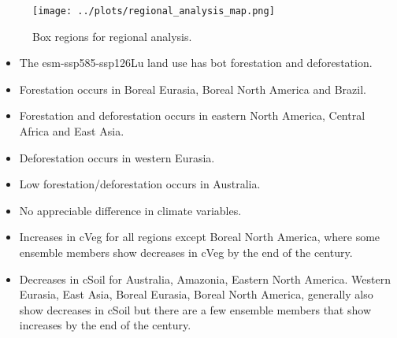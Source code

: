 \documentclass[]{article}
\begin{document}
\begin{figure}[H]
    \centering
    \texttt{[image: ../plots/regional\_analysis\_map.png]}
    \caption{Box regions for regional analysis.}
    \label{fig:box_regions}
\end{figure}

\begin{itemize}
    \item The esm-ssp585-ssp126Lu land use has bot forestation and deforestation.
    \item Forestation occurs in Boreal Eurasia, Boreal North America and Brazil.
    \item Forestation and deforestation occurs in eastern North America, Central Africa and East Asia.
    \item Deforestation occurs in western Eurasia.
    \item Low forestation/deforestation occurs in Australia.
    \item No appreciable difference in climate variables.
    \item Increases in cVeg for all regions except Boreal North America, where some ensemble members show decreases in cVeg by the end of the century.
    \item Decreases in cSoil for Australia, Amazonia, Eastern North America. Western Eurasia, East Asia, Boreal Eurasia, Boreal North America, generally also show decreases in cSoil but there are a few ensemble members that show increases by the end of the century.
\end{itemize}
\end{document}
